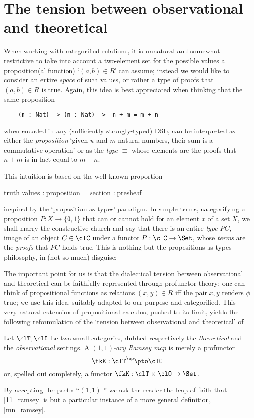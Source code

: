 \section{The tension between observational and theoretical}
\label{sec:orge11c3c4}
When working with categorified relations, it is unnatural and somewhat restrictive to take into account a two-element set for the possible values a proposition(al function) `$(a,b)\in R$' can assume; instead we would like to consider an entire \emph{space} of such values, or rather a type of proofs that $(a,b)\in R$ is true. Again, this idea is best appreciated when thinking that the same proposition 
\begin{center}
	\begin{verbatim}
	(n : Nat) -> (m : Nat) ->  n + m = m + n 
	\end{verbatim}
\end{center}
when encoded in any (sufficiently strongly-typed) DSL, can be interpreted as either the \emph{proposition} `given $n$ and $m$ natural numbers, their sum is a commutative operation' or as the \emph{type}  $\equiv$  whose elements are the proofs that $n+m$ is in fact equal to $m+n$.

This intuition is based on the well-known proportion
\begin{center}
	truth values : proposition = section : presheaf
\end{center}
inspired by the `proposition as types' paradigm. In simple terms, categorifying a proposition $P : X\to \{0,1\}$ that can or cannot hold for an element $x$ of a set $X$, we shall marry the constructive church and say that there is an entire \emph{type} $PC$, image of an object $C\in\clC$ under a functor $P : \clC \to \Set$, whose \emph{terms} are the \emph{proofs} that $PC$ holds true. This is nothing but the propositions-as-types philosophy, in (not so much) disguise: \cite{hottbook,wadler,martin1984intuitionistic}

The important point for us is that the dialectical tension between observational and theoretical can be faithfully represented through profunctor theory; one can think of propositional functions as relations $(x,y)\in R$ iff the pair $x,y$ renders $\phi$ true; we use this idea, suitably adapted to our purpose and categorified. This very natural extension of propositional calculus, pushed to its limit, yields the following reformulation of the `tension between observational and theoretical' of \cite{u,v,w}
\begin{definition}\label{11_ramsey}
	Let $\clT,\clO$ be two small categories, dubbed respectively the \emph{theoretical} and the \emph{observational} settings. A \emph{$(1,1)$-ary Ramsey map} is merely a profunctor
	\[\fkK : \clT^\op \pto \clO\]
	or, spelled out completely, a functor $\fkK : \clT\times \clO \to \Set$.
\end{definition}
By accepting the prefix ``$(1,1)$-'' we ask the reader the leap of faith that \autoref{11_ramsey} is but a particular instance of a more general definition, \autoref{mn_ramsey}. 

